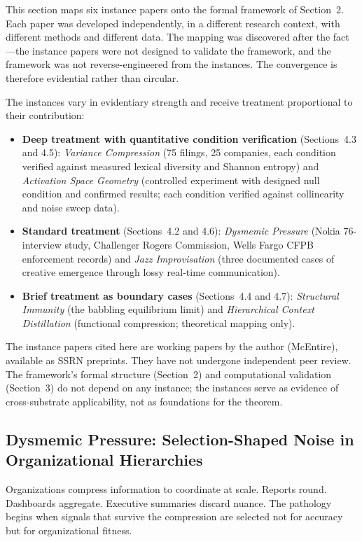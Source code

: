 \documentclass[12pt,letterpaper]{article}
\theoremstyle{definition}
\theoremstyle{remark}
\begin{document}
This section maps six instance papers onto the formal framework of Section~2. Each paper was developed independently, in a different research context, with different methods and different data. The mapping was discovered after the fact---the instance papers were not designed to validate the framework, and the framework was not reverse-engineered from the instances. The convergence is therefore evidential rather than circular.

The instances vary in evidentiary strength and receive treatment proportional to their contribution:
\begin{itemize}
    \item \textbf{Deep treatment with quantitative condition verification} (Sections~4.3 and 4.5): \emph{Variance Compression} (75 filings, 25 companies, each condition verified against measured lexical diversity and Shannon entropy) and \emph{Activation Space Geometry} (controlled experiment with designed null condition and confirmed results; each condition verified against collinearity and noise sweep data).
    \item \textbf{Standard treatment} (Sections~4.2 and 4.6): \emph{Dysmemic Pressure} (Nokia 76-interview study, Challenger Rogers Commission, Wells Fargo CFPB enforcement records) and \emph{Jazz Improvisation} (three documented cases of creative emergence through lossy real-time communication).
    \item \textbf{Brief treatment as boundary cases} (Sections~4.4 and 4.7): \emph{Structural Immunity} (the babbling equilibrium limit) and \emph{Hierarchical Context Distillation} (functional compression; theoretical mapping only).
\end{itemize}

The instance papers cited here are working papers by the author (McEntire), available as SSRN preprints. They have not undergone independent peer review. The framework's formal structure (Section~2) and computational validation (Section~3) do not depend on any instance; the instances serve as evidence of cross-substrate applicability, not as foundations for the theorem.


\subsection{Dysmemic Pressure: Selection-Shaped Noise in Organizational Hierarchies}

Organizations compress information to coordinate at scale. Reports round. Dashboards aggregate. Executive summaries discard nuance. The pathology begins when signals that survive the compression are selected not for accuracy but for organizational fitness.
\end{document}
